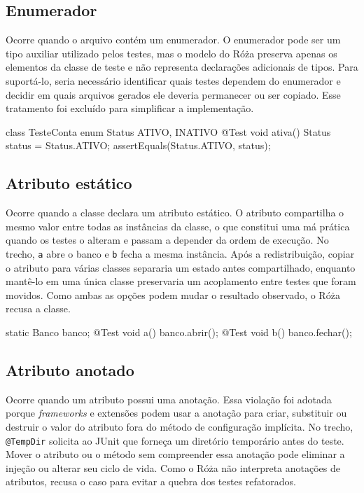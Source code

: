 \subsection{Enumerador}

Ocorre quando o arquivo contém um enumerador. O enumerador pode ser um tipo auxiliar utilizado pelos testes, mas o modelo do Róża preserva apenas os elementos da classe de teste e não representa declarações adicionais de tipos. Para suportá-lo, seria necessário identificar quais testes dependem do enumerador e decidir em quais arquivos gerados ele deveria permanecer ou ser copiado. Esse tratamento foi excluído para simplificar a implementação.

\begin{violationexample}
class TesteConta {
    enum Status { ATIVO, INATIVO }
    @Test void ativa() {
        Status status = Status.ATIVO;
        assertEquals(Status.ATIVO, status);
    }
}
\end{violationexample}

\subsection{Atributo estático}

Ocorre quando a classe declara um atributo estático. O atributo compartilha o mesmo valor entre todas as instâncias da classe, o que constitui uma má prática quando os testes o alteram e passam a depender da ordem de execução. No trecho, \texttt{a} abre o banco e \texttt{b} fecha a mesma instância. Após a redistribuição, copiar o atributo para várias classes separaria um estado antes compartilhado, enquanto mantê-lo em uma única classe preservaria um acoplamento entre testes que foram movidos. Como ambas as opções podem mudar o resultado observado, o Róża recusa a classe.

\begin{violationexample}
static Banco banco;
@Test void a() { banco.abrir(); }
@Test void b() { banco.fechar(); }
\end{violationexample}

\subsection{Atributo anotado}

Ocorre quando um atributo possui uma anotação. Essa violação foi adotada porque \textit{frameworks} e extensões podem usar a anotação para criar, substituir ou destruir o valor do atributo fora do método de configuração implícita. No trecho, \texttt{@TempDir} solicita ao JUnit que forneça um diretório temporário antes do teste. Mover o atributo ou o método sem compreender essa anotação pode eliminar a injeção ou alterar seu ciclo de vida. Como o Róża não interpreta anotações de atributos, recusa o caso para evitar a quebra dos testes refatorados.

